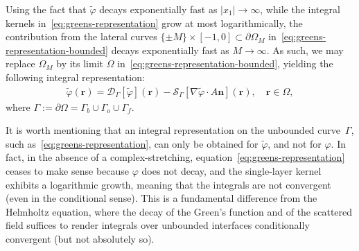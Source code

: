 \documentclass[review,hidelinks,onefignum,onetabnum]{siamart220329}
\newcommand{\R}{\mathbb{R}}
\newcommand{\bn}{\mathbf{n}}
\newcommand{\bx}{\mathbf{x}}
\newcommand{\br}{\boldsymbol{r}}
\newcommand{\tvarphi}{\widetilde \varphi}
\begin{document}
Using the fact that $\tvarphi$ decays exponentially fast as $|x_1| \to \infty$, while the integral kernels in~\cref{eq:greens-representation} grow at most logarithmically, the contribution from the lateral curves $\{ \pm M\} \times
[-1,0]\subset\partial\Omega_M$ in~\eqref{eq:greens-representation-bounded} decays exponentially fast as $M \to \infty$. As such, we may
replace $\Omega_M$ by its limit $\Omega$ in~\cref{eq:greens-representation-bounded}, yielding the following integral representation:
\begin{align}
  \label{eq:greens-representation}
  \tvarphi(\br) = \mathcal{D}_{\Gamma}[\tvarphi](\br) - \mathcal{S}_{\Gamma}[\nabla \tvarphi \cdot A \bn](\br), \quad  \br \in \Omega,
\end{align}
where $\Gamma := \partial \Omega = \Gamma_b \cup \Gamma_o \cup \Gamma_f$. 

It is worth mentioning that an integral representation on the unbounded curve~$\Gamma$, such as~\cref{eq:greens-representation}, can only be obtained for $\tvarphi$, and not for $\varphi$. In fact, in the absence of a complex-stretching, equation~\cref{eq:greens-representation} ceases to make sense because $\varphi$ does not decay, and the single-layer kernel exhibits a logarithmic growth, meaning that the integrals are not convergent (even in the conditional sense). This is a fundamental difference from the Helmholtz equation, where the decay of the Green's function and of the scattered field suffices to render integrals over unbounded interfaces conditionally convergent (but not absolutely so). 
\end{document}
